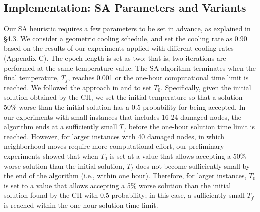 \documentclass[11pt]{article}
\begin{document}








\subsection{Implementation: SA Parameters and Variants}

Our SA heuristic requires a few parameters to be set in advance, as explained in \S 4.3. We consider a geometric cooling schedule, and set the cooling rate as 0.90 based on the results of our experiments applied with different cooling rates (Appendix C). The epoch length is set as two; that is, two iterations are performed at the same temperature value. The SA algorithm terminates when the final temperature, $T_{f}$, reaches 0.001 or the one-hour computational time limit is reached. We followed the approach in \cite{ropke_adaptive_2006} and \cite{wei_simulated_2018-1} to set $T_{0}$. Specifically, given the initial solution obtained by the CH, we set the initial temperature so that a solution 50\% worse than the initial solution has a 0.5 probability for being accepted. In our experiments with small instances that includes 16-24 damaged nodes, the algorithm ends at a sufficiently small $T_{f}$ before the one-hour solution time limit is reached. However, for larger instances with 40 damaged nodes, in which neighborhood moves require more computational effort, our preliminary experiments showed that when $T_{0}$ is set at a value that allows accepting a 50\% worse solution than the initial solution, $T_{f}$ does not become sufficiently small by the end of the algorithm (i.e., within one hour). Therefore, for larger instances, $T_{0}$ is set to a value that allows accepting a 5\% worse solution than the initial solution found by the CH with 0.5 probability; in this case, a sufficiently small $T_{f}$ is reached within the one-hour solution time limit. 
\end{document}
